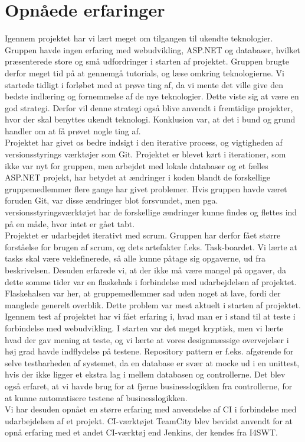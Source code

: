\chapter{Opnåede erfaringer}

Igennem projektet har vi lært meget om tilgangen til ukendte teknologier. Gruppen havde ingen erfaring med webudvikling, ASP.NET og databaser, hvilket præsenterede store og små udfordringer i starten af projektet. Gruppen brugte derfor meget tid på at gennemgå tutorials, og læse omkring teknologierne. Vi startede tidligt i forløbet med at prøve ting af, da vi mente det ville give den bedste indlæring og fornemmelse af de nye teknologier. Dette viste sig at være en god strategi. Derfor vil denne strategi også blive anvendt i fremtidige projekter, hvor der skal benyttes ukendt teknologi. Konklusion var, at det i bund og grund handler om at få prøvet nogle ting af.\\

\noindent Projektet har givet os bedre indsigt i den iterative process, og vigtigheden af versionsstyrings værktøjer som Git. Projektet er blevet kørt i iterationer, som ikke var nyt for gruppen, men arbejdet med lokale databaser og et fælles ASP.NET projekt, har betydet at ændringer i koden blandt de forskellige gruppemedlemmer flere gange har givet problemer. Hvis gruppen havde været foruden Git, var disse ændringer blot forsvundet, men pga. versionsstyringsværktøjet har de forskellige ændringer kunne findes og flettes ind på en måde, hvor intet er gået tabt. \\

\noindent Projektet er udarbejdet iterativt med scrum. Gruppen har derfor fået større forståelse for brugen af scrum, og dets artefakter f.eks. Task-boardet. Vi lærte at tasks skal være veldefinerede, så alle kunne påtage sig opgaverne, ud fra beskrivelsen. Desuden erfarede vi, at der ikke må være mangel på opgaver, da dette somme tider var en flaskehals i forbindelse med udarbejdelsen af projektet. Flaskehalsen var her, at gruppemedlemmer sad uden noget at lave, fordi der manglede generelt overblik. Dette problem var mest aktuelt i starten af projektet.\\

\noindent Igennem test af projektet har vi fået erfaring i, hvad man er i stand til at teste i forbindelse med webudvikling. I starten var det meget kryptisk, men vi lærte hvad der gav mening at teste, og vi lærte at vores designmæssige overvejelser i høj grad havde indflydelse på testene. Repository pattern er f.eks. afgørende for selve testbarheden af systemet, da en database er svær at mocke ud i en unittest, hvis der ikke ligger et ekstra lag i mellem databasen og controllerne. Det blev også erfaret, at vi havde brug for at fjerne businesslogikken fra controllerne, for at kunne automatisere testene af businesslogikken.\\

\noindent Vi har desuden opnået en større erfaring med anvendelse af CI i forbindelse med udarbejdelsen af et projekt. CI-værktøjet TeamCity blev bevidst anvendt for at opnå erfaring med et andet CI-værktøj end Jenkins, der kendes fra I4SWT.


